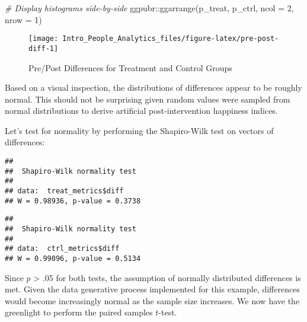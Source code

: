 \documentclass[
]{book}
\newenvironment{Shaded}{\begin{snugshade}}{\end{snugshade}}
\newcommand{\AttributeTok}[1]{\textcolor[rgb]{0.77,0.63,0.00}{#1}}
\newcommand{\CommentTok}[1]{\textcolor[rgb]{0.56,0.35,0.01}{\textit{#1}}}
\newcommand{\DecValTok}[1]{\textcolor[rgb]{0.00,0.00,0.81}{#1}}
\newcommand{\FunctionTok}[1]{\textcolor[rgb]{0.00,0.00,0.00}{#1}}
\newcommand{\NormalTok}[1]{#1}
\newcommand{\SpecialCharTok}[1]{\textcolor[rgb]{0.00,0.00,0.00}{#1}}
\begin{document}
\begin{Shaded}
\begin{Highlighting}[]
\CommentTok{\# Display histograms side{-}by{-}side}
\NormalTok{ggpubr}\SpecialCharTok{::}\FunctionTok{ggarrange}\NormalTok{(p\_treat, p\_ctrl, }\AttributeTok{ncol =} \DecValTok{2}\NormalTok{, }\AttributeTok{nrow =} \DecValTok{1}\NormalTok{)}
\end{Highlighting}
\end{Shaded}

\begin{figure}

{\centering \texttt{[image: Intro\_People\_Analytics\_files/figure-latex/pre-post-diff-1]} 

}

\caption{Pre/Post Differences for Treatment and Control Groups}\label{fig:pre-post-diff}
\end{figure}

Based on a visual inspection, the distributions of differences appear to be roughly normal. This should not be surprising given random values were sampled from normal distributions to derive artificial post-intervention happiness indices.

Let's test for normality by performing the Shapiro-Wilk test on vectors of differences:

\begin{Shaded}
\end{Shaded}

\begin{verbatim}
## 
##  Shapiro-Wilk normality test
## 
## data:  treat_metrics$diff
## W = 0.98936, p-value = 0.3738
\end{verbatim}

\begin{Shaded}
\end{Shaded}

\begin{verbatim}
## 
##  Shapiro-Wilk normality test
## 
## data:  ctrl_metrics$diff
## W = 0.99096, p-value = 0.5134
\end{verbatim}

Since \(p\) \textgreater{} .05 for both tests, the assumption of normally distributed differences is met. Given the data generative process implemented for this example, differences would become increasingly normal as the sample size increases. We now have the greenlight to perform the paired samples \(t\)-test.
\end{document}
